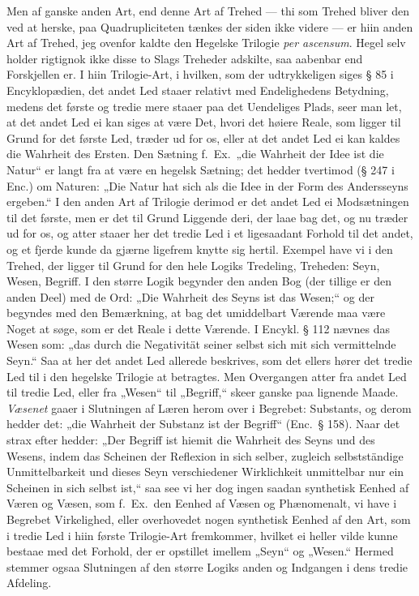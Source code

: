 \documentclass[12pt,a4paper]{book}
\newcommand{\apage}[1]{\marginnote{\footnotesize\textit{[#1]}}}
\begin{document}
Men af ganske anden Art, end denne Art af Trehed --- thi som Trehed bliver den
ved at herske, paa Quadrupliciteten tænkes der siden ikke videre --- er hiin
anden Art af Trehed, jeg ovenfor kaldte den Hegelske Trilogie \textit{per
ascensum}. Hegel selv holder rigtignok ikke disse to Slags Treheder adskilte,
saa aabenbar end Forskjellen er. I hiin Trilogie-Art, i hvilken, som der
udtrykkeligen siges § 85 i Encyklopædien, det andet Led staaer relativt med
Endelighedens Betydning, medens det første og \apage{128} tredie mere staaer paa det
Uendeliges Plads, seer man let, at det andet Led ei kan siges at være Det,
hvori det høiere Reale, som ligger til Grund for det første Led, træder ud for
os, eller at det andet Led ei kan kaldes die Wahrheit des Ersten. Den Sætning
f.\ Ex.\ „die Wahrheit der Idee ist die Natur“ er langt fra at være en hegelsk
Sætning; det hedder tvertimod (§ 247 i Enc.) om Naturen: „Die Natur hat sich
als die Idee in der Form des Andersseyns ergeben.“ I den anden Art af Trilogie
derimod er det andet Led ei Modsætningen til det første, men er det til Grund
Liggende deri, der laae bag det, og nu træder ud for os, og atter staaer her
det tredie Led i et ligesaadant Forhold til det andet, og et fjerde kunde da
gjærne ligefrem knytte sig hertil. Exempel have vi i den Trehed, der ligger til
Grund for den hele Logiks Tredeling, Treheden: Seyn, Wesen, Begriff. I den
større Logik begynder den anden Bog (der tillige er den anden Deel) med de Ord:
„Die Wahrheit des Seyns ist das Wesen;“ og der begyndes med den Bemærkning, at
bag det umiddelbart Værende maa være Noget at søge, som er det Reale i dette
Værende. I Encykl. § 112 nævnes das Wesen som: „das durch die Negativität
seiner selbst sich mit sich vermittelnde Seyn.“ Saa at her det andet Led
allerede beskrives, som det ellers hører det tredie Led til i den hegelske
Trilogie at betragtes. Men Overgangen atter fra andet Led til tredie Led, eller
fra „Wesen“ til „Begriff,“ skeer ganske paa lignende Maade. \emph{Væsenet} gaaer i
Slutningen af Læren herom over i Begrebet: Substants, og derom hedder det: „die
Wahrheit der Substanz ist der Begriff“ (Enc.\ § 158). Naar det strax efter
hedder: „Der Begriff ist hiemit die Wahrheit des Seyns und des Wesens, indem
das Scheinen der Reflexion in sich selber, zugleich selbstständige
Unmittelbarkeit und dieses Seyn verschiedener Wirklichkeit unmittelbar nur ein
Scheinen in sich selbst ist,“ saa see vi her dog ingen saadan synthetisk Eenhed
af Væren og \apage{129} Væsen, som f.\ Ex.\ den Eenhed af Væsen og Phænomenalt, vi have i
Begrebet Virkelighed, eller overhovedet nogen synthetisk Eenhed af den Art, som
i tredie Led i hiin første Trilogie-Art fremkommer, hvilket ei heller vilde
kunne bestaae med det Forhold, der er opstillet imellem „Seyn“ og „Wesen.“
Hermed stemmer ogsaa Slutningen af den større Logiks anden og Indgangen i dens
tredie Afdeling.
\end{document}
